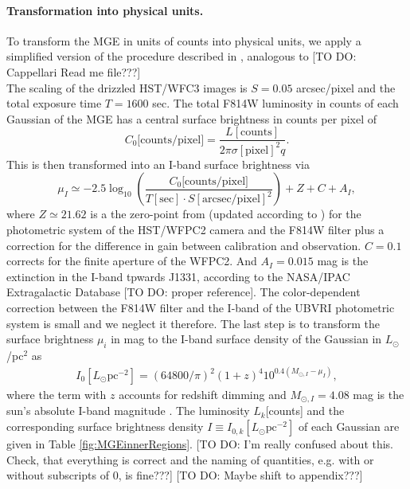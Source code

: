 \paragraph{Transformation into physical units.} To transform the MGE in units of counts into physical units, we apply a simplified version of the procedure described in \citet{Holtzman}, analogous to [TO DO: Cappellari Read me file???]
\\The scaling of the drizzled HST/WFC3 images is  $S = 0.05$ arcsec/pixel and the total exposure time $T = 1600$ sec. The total F814W luminosity in counts of each Gaussian of the MGE has a central surface brightness in counts per pixel of
\begin{equation*}
C_0\text{[counts/pixel]} = \frac{L[\text{counts}]}{2\pi \sigma[\text{pixel}]^2 q}.
\end{equation*}
This is then transformed into an I-band surface brightness via
\begin{equation}
\mu_I \simeq -2.5 \log_{10}\left( \frac{C_0\text{[counts/pixel]}}{T[\text{sec}] \cdot S[\text{arcsec/pixel}]^2}\right) + Z + C + A_I, \label{eq:muI_}
\end{equation}
where $Z\simeq21.62$ is a the zero-point from \citet{Holtzman}  (updated according to \citet{Dolphin,DolphinNew}) for the photometric system of the HST/WFPC2 camera and the F814W filter plus a correction for the difference in gain between calibration and observation. $C= 0.1$ corrects for the finite aperture of the WFPC2. And $A_I =0.015$ mag  is the extinction in the I-band tpwards J1331, according to the NASA/IPAC Extragalactic Database [TO DO: proper reference]. The color-dependent correction between the F814W filter and the I-band of the UBVRI photometric system is  small \citep{Holtzman} and we neglect it therefore. The last step is to transform the surface brightness $\mu_i$ in mag to the I-band surface density of the Gaussian in $L_\odot$/pc$^2$ as
\begin{eqnarray*}
I_0[L_\odot \text{pc}^{-2}] = \left( 64800/\pi\right)^2 \left(1+z \right)^4 10^{0.4\left(M_{\odot,I}-\mu_I \right)},
\end{eqnarray*}
where the term with $z$ accounts for redshift dimming and $M_{\odot,I}=4.08$ mag is the sun's absolute I-band magnitude \citep{1998gaas.book.....B}. The luminosity $L_k$[counts] and the corresponding surface brightness density $I \equiv I_{0,k}[L_\odot \text{pc}^{-2}]$ of each Gaussian are given in Table \ref{fig:MGEinnerRegions}. [TO DO: I'm really confused about this. Check, that everything is correct and the naming of quantities, e.g. with or without subscripts of 0, is fine???] [TO DO: Maybe shift to appendix???]

